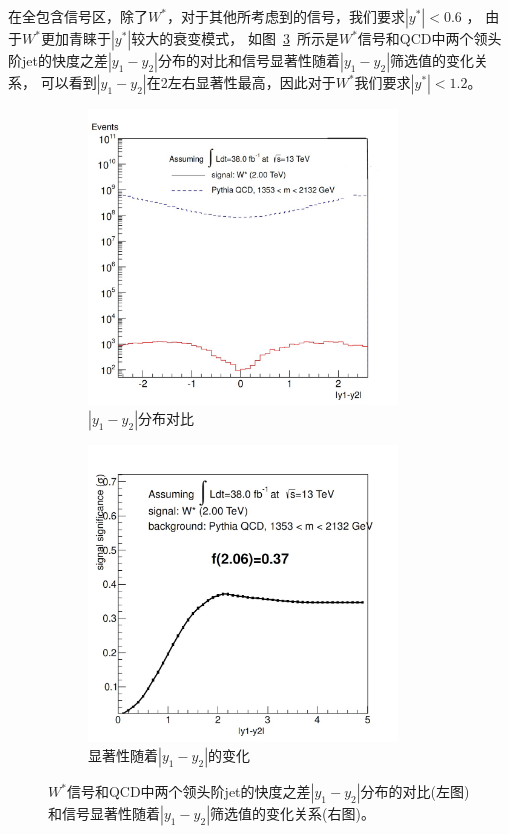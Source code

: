 在全包含信号区，除了$W^*$，对于其他所考虑到的信号，我们要求$|y^*|<0.6$ ，
由于$W^*$更加青睐于$|y^*|$较大的衰变模式，
如图~\ref{fig:Selection1}~所示是$W^*$信号和QCD中两个领头阶jet的快度之差$|y_1-y_2|$分布的对比和信号显著性随着$|y_1-y_2|$筛选值的变化关系，
可以看到$|y_1-y_2|$在2左右显著性最高，因此对于$W^*$我们要求$|y^*|<1.2$。

\begin{figure}[htbp]
  \begin{subfigure}{.5\textwidth}
  \centering
   \includegraphics[width=0.9\textwidth]{figuresDijet/03-BenchmarkSignals/DeltaY.jpg}
   \caption{$|y_1-y_2|$分布对比}
   \label{fig:WSY1}
  \end{subfigure}
  \begin{subfigure}{.5\textwidth}
  \centering
   \includegraphics[width=0.9\textwidth]{figuresDijet/03-BenchmarkSignals/Significance.jpg}
   \caption{显著性随着$|y_1-y_2|$的变化}
   \label{fig:WSY2}
  \end{subfigure}
  \caption{$W^*$信号和QCD中两个领头阶jet的快度之差$|y_1-y_2|$分布的对比(左图)和信号显著性随着$|y_1-y_2|$筛选值的变化关系(右图)。}
  \label{fig:Selection1}
\end{figure} 

